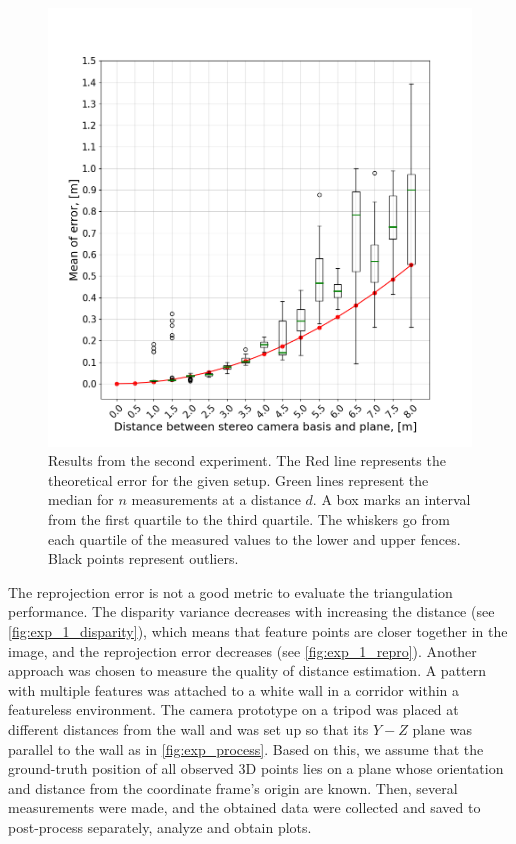 \begin{figure}[ht]
    \centering
    \includegraphics[width=\textwidth]{graphics/experiment_2_general.png}
    \caption[Results from the second experiment.]{Results from the second experiment.
    The Red line represents the theoretical error for the given setup.
        Green lines represent the median for $n$ measurements at a distance $d$. 
        A box marks an interval from the first quartile to the third quartile.
        The whiskers go from each quartile of the measured values to the lower and upper fences.
        Black points represent outliers.
    }
    \label{fig:exp_2_general}
\end{figure}

The reprojection error is not a good metric to evaluate the triangulation performance.
The disparity variance decreases with increasing the distance (see \autoref{fig:exp_1_disparity}), which means that feature points are closer together in the image, and the reprojection error decreases (see \autoref{fig:exp_1_repro}).
Another approach was chosen to measure the quality of distance estimation.
A pattern with multiple features was attached to a white wall in a corridor within a featureless environment.
The camera prototype on a tripod was placed at different distances from the wall and was set up so that its $Y-Z$ plane was parallel to the wall as in \autoref{fig:exp_process}.
Based on this, we assume that the ground-truth position of all observed 3D points lies on a plane whose orientation and distance from the coordinate frame's origin are known.
Then, several measurements were made, and the obtained data were collected and saved to post-process separately, analyze and obtain plots.

